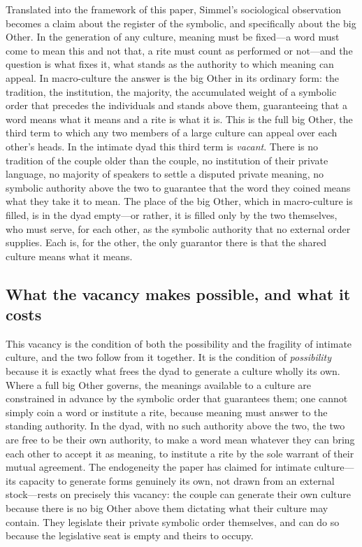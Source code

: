 Translated into the framework of this paper, Simmel's sociological observation becomes a claim about the register of the symbolic, and specifically about the big Other. In the generation of any culture, meaning must be fixed---a word must come to mean this and not that, a rite must count as performed or not---and the question is what fixes it, what stands as the authority to which meaning can appeal. In macro-culture the answer is the big Other in its ordinary form: the tradition, the institution, the majority, the accumulated weight of a symbolic order that precedes the individuals and stands above them, guaranteeing that a word means what it means and a rite is what it is. This is the full big Other, the third term to which any two members of a large culture can appeal over each other's heads. In the intimate dyad this third term is \emph{vacant}. There is no tradition of the couple older than the couple, no institution of their private language, no majority of speakers to settle a disputed private meaning, no symbolic authority above the two to guarantee that the word they coined means what they take it to mean. The place of the big Other, which in macro-culture is filled, is in the dyad empty---or rather, it is filled only by the two themselves, who must serve, for each other, as the symbolic authority that no external order supplies. Each is, for the other, the only guarantor there is that the shared culture means what it means.

\subsection*{What the vacancy makes possible, and what it costs}

This vacancy is the condition of both the possibility and the fragility of intimate culture, and the two follow from it together. It is the condition of \emph{possibility} because it is exactly what frees the dyad to generate a culture wholly its own. Where a full big Other governs, the meanings available to a culture are constrained in advance by the symbolic order that guarantees them; one cannot simply coin a word or institute a rite, because meaning must answer to the standing authority. In the dyad, with no such authority above the two, the two are free to be their own authority, to make a word mean whatever they can bring each other to accept it as meaning, to institute a rite by the sole warrant of their mutual agreement. The endogeneity the paper has claimed for intimate culture---its capacity to generate forms genuinely its own, not drawn from an external stock---rests on precisely this vacancy: the couple can generate their own culture because there is no big Other above them dictating what their culture may contain. They legislate their private symbolic order themselves, and can do so because the legislative seat is empty and theirs to occupy.

